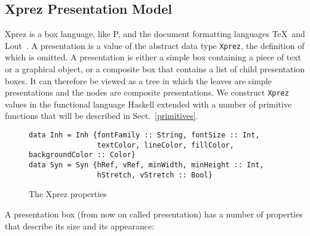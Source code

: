 %																
\subsection{{\sc Xprez} Presentation Model}

{\sc Xprez} is a box language, like P, and the document formatting languages \TeX ~and Lout~\cite{lout}. A presentation is a value of the abstract data type \texttt{Xprez}, the definition of which is omitted. A presentation is either a simple box containing a piece of text or a graphical object, or a composite box that contains a list of child presentation boxes. It can therefore be viewed as a tree in which the leaves are simple presentations and the nodes are composite presentations. We construct \texttt{Xprez} values in the functional language Haskell extended with a number of primitive functions that will be described in Sect.~\ref{primitives}.

\begin{figure}
\begin{small}
\begin{center}
\begin{small}
\begin{verbatim}
data Inh = Inh {fontFamily :: String, fontSize :: Int,
                textColor, lineColor, fillColor, backgroundColor :: Color} 
data Syn = Syn {hRef, vRef, minWidth, minHeight :: Int,
                hStretch, vStretch :: Bool}
\end{verbatim}
\end{small}
\caption{The {\sc Xprez} properties}\label{xprezproperties} 
\end{center}
\end{small}
\end{figure}
\pagebreak

A presentation box (from now on called presentation) has a number of properties that describe its size and its appearance: 

\begin{center}
\end{center}

